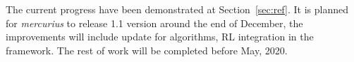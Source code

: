 The current progress have been demonstrated at Section~\ref{sec:ref}. It is planned for \textit{mercurius} to release 1.1 version around the end of December, the improvements will include update for algorithms, RL integration in the framework. The rest of work will be completed before May, 2020.


